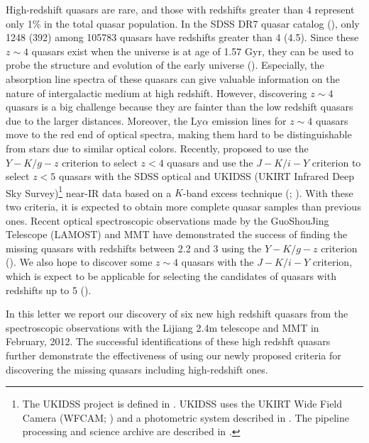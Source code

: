 \documentclass[referee]{raa}
\begin{document}
High-redshift quasars are rare, and those with redshifts
greater than 4 represent only 1\%  in the total quasar population. In
the SDSS DR7 quasar catalog (\citealt{Schneider+etal+2010}), only 1248 (392) among  105783 quasars have redshifts
greater than 4 (4.5). Since these $z\sim4$ quasars exist when the universe is at age of 1.57 Gyr, they
can be used to probe the structure and evolution of the early universe (\citealt{Smith+etal+1994, Constantin+etal+2002}). Especially, the
absorption line spectra of these quasars can give valuable information on the nature
of intergalactic medium at high redshift.
However, discovering $z\sim4$ quasars is a big challenge  because they are
fainter than the low redshift quasars due to the larger distances.  Moreover,
the Ly$\alpha$ emission lines for  $z\sim4$ quasars move to the red end of optical spectra,
making them hard to be distinguishable from stars due to similar optical
colors. Recently, \cite{Wu+Jia+2010}
proposed to use the $Y-K/g-z$ criterion to select $z<4$ quasars and use the $J-K/i-Y$
criterion to select $z<5$ quasars with
the SDSS optical and UKIDSS (UKIRT  Infrared Deep Sky Survey)\footnote{The UKIDSS project is defined in \cite{Lawrence+etal+2007}. UKIDSS uses the UKIRT Wide Field Camera (WFCAM; \citealt{Casali+etal+2007}) and a photometric system described in \cite{Hewett+etal+2006}. The pipeline processing and science archive are described in \cite{Hambly+etal+2008}. } near-IR data based on a $K$-band excess technique (\citealt{Warren+etal+2000, Hewett+etal+2006, Chiu+etal+2007};
\citealt{Maddox+etal+2008}).
With these two criteria, it is expected to obtain more complete quasar samples than previous ones.
Recent optical spectroscopic observations made by the GuoShouJing Telescope (LAMOST)
and  MMT have demonstrated the success of finding the missing quasars
with redshifts between 2.2 and 3 using the $Y-K/g-z$ criterion (\citealt{Wu+etal+2010a, Wu+etal+2010b, Wu+etal+2011}).
We also hope to discover some  $z\sim4$ quasars with the  $J-K/i-Y$ criterion, which is expect to be
applicable for selecting the candidates of quasars with redshifts up to 5 (\citealt{Wu+Jia+2010}).

In this letter we report our discovery of six  new high redshift quasars from the spectroscopic observations with the Lijiang 2.4m telescope and MMT in February, 2012.
The successful identifications of these high redshft quasars further demonstrate the effectiveness of using our newly proposed criteria for discovering the missing quasars including high-redshift ones.
\end{document}
